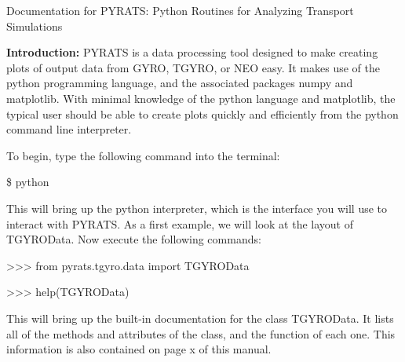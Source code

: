\documentclass{article}
\begin{document}
\begin{center}
\Large
Documentation for PYRATS:
Python Routines for Analyzing Transport Simulations
\end{center}
\normalsize

\noindent \textbf{Introduction: }PYRATS is a data processing tool designed to make creating plots of output data from GYRO, TGYRO, or NEO easy.  It makes use of the python programming language, and the associated packages numpy and matplotlib.  With minimal knowledge of the python language and matplotlib, the typical user should be able to create plots quickly and efficiently from the python command line interpreter.

\noindent To begin, type the following command into the terminal:
\fontfamily{\ttdefault}\selectfont

\$ python

\fontfamily{\rmdefault}\selectfont
\noindent This will bring up the python interpreter, which is the interface you will use to interact with PYRATS.  As a first example, we will look at the layout of TGYROData.  Now execute the following commands:
\fontfamily{\ttdefault}\selectfont

>>> from pyrats.tgyro.data import TGYROData

>>> help(TGYROData)

\fontfamily{\rmdefault}\selectfont
\noindent This will bring up the built-in documentation for the class TGYROData.  It lists all of the methods and attributes of the class, and the function of each one.  This information is also contained on page x of this manual.  
\end{document}
